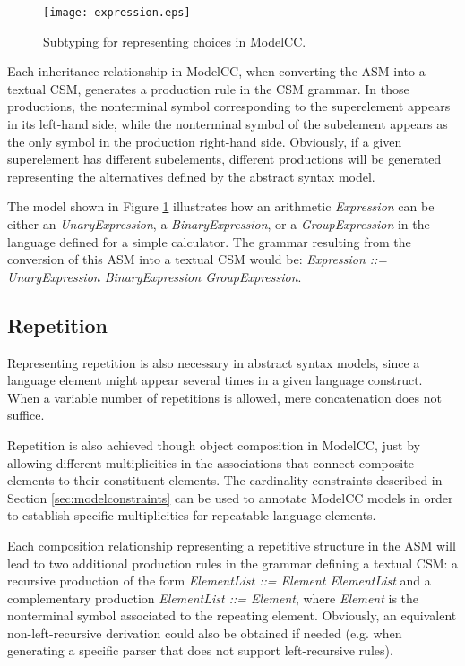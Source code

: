 \documentclass[preprint]{elsarticle}
\newcommand{\etexttt}[1]{\textit{#1}}
\begin{document}
\begin{figure}[tb!]
\centering
\texttt{[image: expression.eps]}
\caption{Subtyping for representing choices in ModelCC.} \label{fig:expression}
\end{figure}

Each inheritance relationship in ModelCC, when converting the ASM into a textual CSM, generates a production rule in the CSM grammar.
In those productions, the nonterminal symbol corresponding to the superelement appears in its left-hand side, while the nonterminal symbol of the subelement appears as the only symbol in the production right-hand side.
Obviously, if a given superelement has  different subelements,  different productions will be generated representing the  alternatives defined by the abstract syntax model.

The model shown in Figure \ref{fig:expression} illustrates how an arithmetic \emph{Expression} can be either an \emph{UnaryExpression}, a \emph{BinaryExpression}, or a \emph{GroupExpression} in the language defined for a simple calculator.
The grammar resulting from the conversion of this ASM into a textual CSM would be: \etexttt{Expression ::= UnaryExpression  BinaryExpression 
GroupExpression}.

\subsection{Repetition}

Representing repetition is also necessary in abstract syntax models, since a language element might appear several times in a given language construct.
When a variable number of repetitions is allowed, mere concatenation does not suffice.

Repetition is also achieved though object composition in ModelCC, just by allowing different multiplicities in the associations that connect composite elements to their constituent elements.
The cardinality constraints described in Section \ref{sec:modelconstraints} can be used to annotate ModelCC models in order to establish specific multiplicities for repeatable language elements.

Each composition relationship representing a repetitive structure in the ASM will lead to two additional production rules in the grammar defining a textual CSM: a recursive production of the form \etexttt{ElementList ::= Element ElementList} and a complementary production \etexttt{ElementList ::= Element}, where \etexttt{Element} is the nonterminal symbol associated to the repeating element.
Obviously, an equivalent non-left-recursive derivation could also be obtained if needed (e.g. when generating a specific parser that does not support left-recursive rules).
\end{document}

